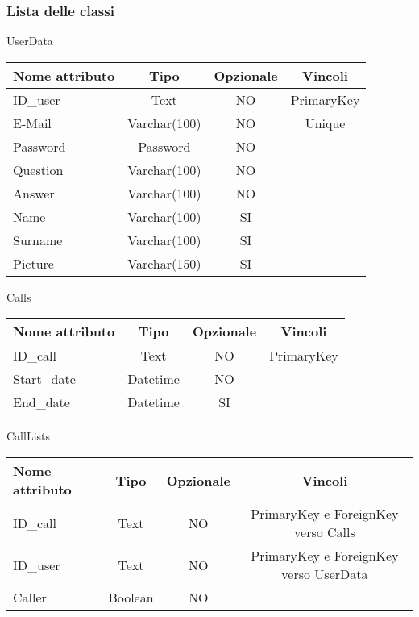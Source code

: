 \subsubsection{Lista delle classi}

\begin{center}

UserData

\begin{center}
\begin{tabular}{lccc}
\toprule
Nome attributo & Tipo & Opzionale & Vincoli\\
\midrule %
ID\_user & Text & NO & PrimaryKey\\
E-Mail & Varchar(100) & NO & Unique\\
Password & Password & NO &\\
Question & Varchar(100) & NO &\\
Answer & Varchar(100) & NO &\\
Name & Varchar(100) & SI &\\
Surname & Varchar(100) & SI &\\
Picture & Varchar(150) & SI &\\
\bottomrule
\end{tabular}
\end{center}

Calls

\begin{center}
\begin{tabular}{lccc}
\toprule
Nome attributo & Tipo & Opzionale & Vincoli\\
\midrule %
ID\_call & Text & NO & PrimaryKey\\
Start\_date & Datetime & NO & \\
End\_date & Datetime & SI &\\
\bottomrule
\end{tabular}
\end{center}

CallLists

\begin{center}
\begin{tabular}{lccc}
\toprule
Nome attributo & Tipo & Opzionale & Vincoli\\
\midrule %
ID\_call & Text & NO & PrimaryKey e ForeignKey verso Calls\\
ID\_user & Text & NO & PrimaryKey e ForeignKey verso UserData \\
Caller & Boolean & NO &\\
\bottomrule
\end{tabular}
\end{center}


\end{center}
